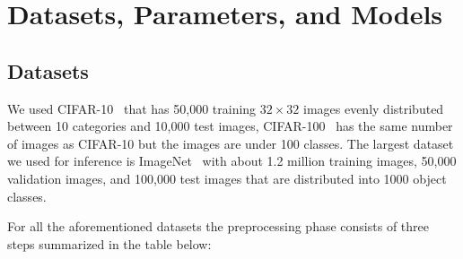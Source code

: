 \documentclass{article}
\begin{document}
\section*{Datasets, Parameters, and Models}
\subsection*{Datasets}
We used CIFAR-10~\citep{krizhevsky2009learning} that has 50,000 training $32\times32$ images evenly distributed between 10 categories and 10,000 test images, CIFAR-100~\citep{krizhevsky2009learning} has the same number of images as CIFAR-10 but the images are under 100 classes. The largest dataset we used for inference is ImageNet~\citep{russakovsky2015imagenet} with about 1.2 million training images, 50,000 validation images, and 100,000 test images that are distributed into 1000 object classes.

For all the aforementioned datasets the preprocessing phase consists of three steps summarized in the table below:
\end{document}
